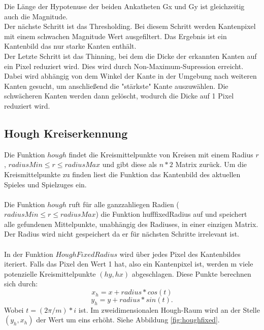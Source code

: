 \documentclass[paper=A4, deutsch]{scrartcl}
\begin{document}
Die Länge der Hypotenuse der beiden Ankatheten Gx und Gy ist gleichzeitig auch die Magnitude.\\
Der nächste Schritt ist das Thresholding. Bei diesem Schritt werden Kantenpixel mit einem schwachen Magnitude Wert ausgefiltert. Das Ergebnis ist ein Kantenbild das nur starke Kanten enthält.\\
Der Letzte Schritt ist das Thinning, bei dem die Dicke der erkannten Kanten auf ein Pixel reduziert wird. Dies wird durch Non-Maximum-Supression erreicht. Dabei wird abhängig von dem Winkel der Kante in der Umgebung nach weiteren Kanten gesucht, um anschließend die "stärkste" Kante auszuwählen. Die schwächeren Kanten werden dann gelöscht, wodurch die Dicke auf 1 Pixel reduziert wird.\\

\subsection{Hough Kreiserkennung}
Die Funktion \(hough\) findet die Kreismittelpunkte von Kreisen mit einem Radius \(r\), \(radiusMin \leq r \leq radiusMax \)  und gibt diese als \(n * 2\) Matrix zurück. 
Um die Kreismittelpunkte zu finden liest die Funktion das Kantenbild des aktuellen Spieles und Spielzuges ein. \\
\\
Die Funktion \(hough\) ruft für alle ganzzahliegen Radien (\(radiusMin \leq r \leq radiusMax\)) die Funktion hufffixedRadius auf und speichert alle gefundenen Mittelpunkte, unabhängig des Radiuses, in einer einzigen Matrix. Der Radius wird nicht gespeichert da er für nächsten Schritte irrelevant ist.\\
\\
In der Funktion \(HoughFixedRadius\) wird über jedes Pixel des Kantenbildes iteriert. Falls das Pixel den Wert 1 hat, also ein Kantenpixel ist, werden m  viele potenzielle Kreismittelpunkte \((hy, hx)\)  abgeschlagen. Diese Punkte berechnen sich durch:  
\begin{equation}
x_{h} = x + radius * cos(t)
\end{equation}
\begin{equation}
y_{h} = y + radius *  sin(t).
\end{equation}
Wobei \(t = (2\pi/m)*i\) ist. 
Im zweidimensionalen Hough-Raum wird an der Stelle \((y_{h}, x_{h})\) der Wert um eins erhöht. Siehe Abbildung \ref{fig:houghfixed}.\\
\end{document}
